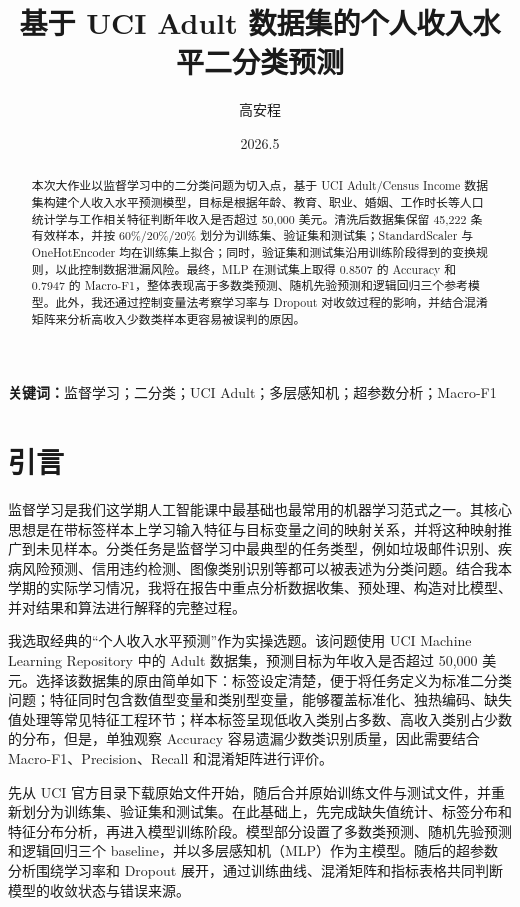 \documentclass[UTF8,a4paper,12pt]{ctexart}
\title{基于 UCI Adult 数据集的个人收入水平二分类预测}
\author{{高安程}\quad {2024302181042}}
\date{2026.5}
\begin{document}
\maketitle

\begin{abstract}
本次大作业以监督学习中的二分类问题为切入点，基于 UCI Adult/Census Income 数据集构建个人收入水平预测模型，目标是根据年龄、教育、职业、婚姻、工作时长等人口统计学与工作相关特征判断年收入是否超过 50,000 美元。清洗后数据集保留 45,222 条有效样本，并按 60\%/20\%/20\% 划分为训练集、验证集和测试集；StandardScaler 与 OneHotEncoder 均在训练集上拟合；同时，验证集和测试集沿用训练阶段得到的变换规则，以此控制数据泄漏风险。最终，MLP 在测试集上取得 0.8507 的 Accuracy 和 0.7947 的 Macro-F1，整体表现高于多数类预测、随机先验预测和逻辑回归三个参考模型。此外，我还通过控制变量法考察学习率与 Dropout 对收敛过程的影响，并结合混淆矩阵来分析高收入少数类样本更容易被误判的原因。
\end{abstract}

\textbf{关键词：}监督学习；二分类；UCI Adult；多层感知机；超参数分析；Macro-F1

\section{引言}
监督学习是我们这学期人工智能课中最基础也最常用的机器学习范式之一。其核心思想是在带标签样本上学习输入特征与目标变量之间的映射关系，并将这种映射推广到未见样本。分类任务是监督学习中最典型的任务类型，例如垃圾邮件识别、疾病风险预测、信用违约检测、图像类别识别等都可以被表述为分类问题。结合我本学期的实际学习情况，我将在报告中重点分析数据收集、预处理、构造对比模型、并对结果和算法进行解释的完整过程。

我选取经典的“个人收入水平预测”作为实操选题。该问题使用 UCI Machine Learning Repository 中的 Adult 数据集\cite{uciadult}，预测目标为年收入是否超过 50,000 美元。选择该数据集的原由简单如下：标签设定清楚，便于将任务定义为标准二分类问题；特征同时包含数值型变量和类别型变量，能够覆盖标准化、独热编码、缺失值处理等常见特征工程环节；样本标签呈现低收入类别占多数、高收入类别占少数的分布，但是，单独观察 Accuracy 容易遗漏少数类识别质量，因此需要结合 Macro-F1、Precision、Recall 和混淆矩阵进行评价。

先从 UCI 官方目录下载原始文件开始，随后合并原始训练文件与测试文件，并重新划分为训练集、验证集和测试集。在此基础上，先完成缺失值统计、标签分布和特征分布分析，再进入模型训练阶段。模型部分设置了多数类预测、随机先验预测和逻辑回归三个 baseline，并以多层感知机（MLP）作为主模型。随后的超参数分析围绕学习率和 Dropout 展开，通过训练曲线、混淆矩阵和指标表格共同判断模型的收敛状态与错误来源。
\end{document}
